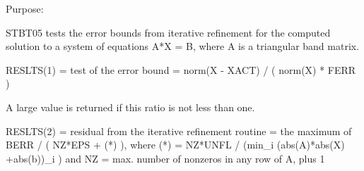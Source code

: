 \begin{DoxyParagraph}{Purpose\+: }
\begin{DoxyVerb} STBT05 tests the error bounds from iterative refinement for the
 computed solution to a system of equations A*X = B, where A is a
 triangular band matrix.

 RESLTS(1) = test of the error bound
           = norm(X - XACT) / ( norm(X) * FERR )

 A large value is returned if this ratio is not less than one.

 RESLTS(2) = residual from the iterative refinement routine
           = the maximum of BERR / ( NZ*EPS + (*) ), where
             (*) = NZ*UNFL / (min_i (abs(A)*abs(X) +abs(b))_i )
             and NZ = max. number of nonzeros in any row of A, plus 1\end{DoxyVerb}
 
\end{DoxyParagraph}

